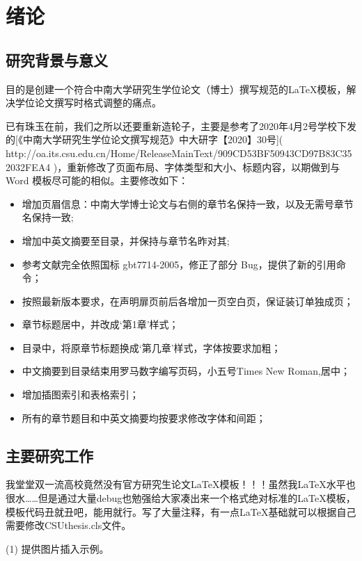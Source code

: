 \section{绪论}
\subsection{研究背景与意义}

目的是创建一个符合中南大学研究生学位论文（博士）撰写规范的LaTeX模板，解决学位论文撰写时格式调整的痛点。

已有珠玉在前，我们之所以还要重新造轮子，主要是参考了2020年4月2号学校下发的[《中南大学研究生学位论文撰写规范》中大研字【2020】30号]( http://oa.its.csu.edu.cn/Home/ReleaseMainText/909CD53BF50943CD97B83C352032FEA4 )，重新修改了页面布局、字体类型和大小、标题内容，以期做到与 Word 模板尽可能的相似。主要修改如下：
\begin{itemize}
\item 增加页眉信息：中南大学博士论文与右侧的章节名保持一致，以及无需号章节名保持一致;
\item 增加中英文摘要至目录，并保持与章节名昨对其;
\item 参考文献完全依照国标 gbt7714-2005，修正了部分 Bug，提供了新的引用命令；
\item 按照最新版本要求，在声明扉页前后各增加一页空白页，保证装订单独成页；
\item 章节标题居中，并改成‘第1章’样式；
\item 目录中，将原章节标题换成‘第几章’样式，字体按要求加粗；
\item 中文摘要到目录结束用罗马数字编写页码，小五号Times New Roman,居中；
\item 增加插图索引和表格索引；
\item 所有的章节题目和中英文摘要均按要求修改字体和间距；
\end{itemize}

\subsection{主要研究工作}
我堂堂双一流高校竟然没有官方研究生论文LaTeX模板！！！虽然我LaTeX水平也很水……但是通过大量debug也勉强给大家凑出来一个格式绝对标准的LaTeX模板，模板代码丑就丑吧，能用就行。写了大量注释，有一点LaTeX基础就可以根据自己需要修改CSUthesis.cls文件。

(1) 提供图片插入示例。


